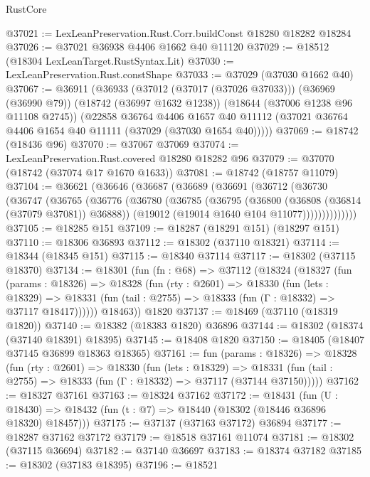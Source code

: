 \begin{lexlean}{RustCore}
\begin{coremodule}
@37021 := LexLeanPreservation.Rust.Corr.buildConst @18280 @18282 @18284
@37026 := @37021 @36938 @4406 @1662 @40 @11120
@37029 := @18512 (@18304 LexLeanTarget.RustSyntax.Lit)
@37030 := LexLeanPreservation.Rust.constShape
@37033 := @37029 (@37030 @1662 @40)
@37067 := @36911
    (@36933
      (@37012 (@37017 (@37026 @37033)))
      (@36969 (@36990 @79))
      (@18742 (@36997 @1632 @1238))
      (@18644 (@37006 @1238 @96 @11108 @2745))
      (@22858
        @36764
        @4406
        @1657
        @40
        @11112
        (@37021 @36764 @4406 @1654 @40 @11111 (@37029 (@37030 @1654 @40)))))
@37069 := @18742 (@18436 @96)
@37070 := @37067 @37069
@37074 := LexLeanPreservation.Rust.covered @18280 @18282 @96
@37079 := @37070 (@18742 (@37074 @17 @1670 @1633))
@37081 := @18742 (@18757 @11079)
@37104 := @36621
    (@36646
      (@36687
        (@36689
          (@36691
            (@36712
              (@36730
                (@36747
                  (@36765
                    (@36776
                      (@36780
                        (@36785
                          (@36795
                            (@36800 (@36808 (@36814 (@37079 @37081)) @36888))
                            (@19012 (@19014 @1640 @104 @11077))))))))))))))
@37105 := @18285 @151
@37109 := @18287 (@18291 @151) (@18297 @151)
@37110 := @18306 @36893
@37112 := @18302 (@37110 @18321)
@37114 := @18344 (@18345 @151)
@37115 := @18340 @37114
@37117 := @18302 (@37115 @18370)
@37134 := @18301
    (fun (fn : @68) =>
    @37112
      (@18324
        (@18327
          (fun (params : @18326) =>
          @18328
            (fun (rty : @2601) =>
            @18330
              (fun (lets : @18329) =>
              @18331 (fun (tail : @2755) => @18333 (fun (Γ : @18332) => @37117 @18417))))))
        @18463))
    @1820
@37137 := @18469 (@37110 (@18319 @1820))
@37140 := @18382 (@18383 @1820) @36896
@37144 := @18302 (@18374 (@37140 @18391) @18395)
@37145 := @18408 @1820
@37150 := @18405 (@18407 @37145 @36899 @18363 @18365)
@37161 := fun (params : @18326) =>
  @18328
    (fun (rty : @2601) =>
    @18330
      (fun (lets : @18329) =>
      @18331 (fun (tail : @2755) => @18333 (fun (Γ : @18332) => @37117 (@37144 @37150)))))
@37162 := @18327 @37161
@37163 := @18324 @37162
@37172 := @18431
    (fun (U : @18430) => @18432 (fun (t : @7) => @18440 (@18302 (@18446 @36896 @18320) @18457)))
@37175 := @37137 (@37163 @37172) @36894
@37177 := @18287 @37162 @37172
@37179 := @18518 @37161 @11074
@37181 := @18302 (@37115 @36694)
@37182 := @37140 @36697
@37183 := @18374 @37182
@37185 := @18302 (@37183 @18395)
@37196 := @18521

\end{coremodule}
\end{lexlean}
